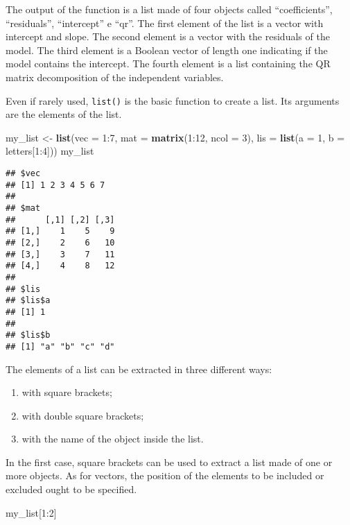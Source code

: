 \documentclass[]{book}
\newenvironment{Shaded}{\begin{snugshade}}{\end{snugshade}}
\newcommand{\KeywordTok}[1]{\textcolor[rgb]{0.13,0.29,0.53}{\textbf{{#1}}}}
\newcommand{\DataTypeTok}[1]{\textcolor[rgb]{0.13,0.29,0.53}{{#1}}}
\newcommand{\DecValTok}[1]{\textcolor[rgb]{0.00,0.00,0.81}{{#1}}}
\newcommand{\StringTok}[1]{\textcolor[rgb]{0.31,0.60,0.02}{{#1}}}
\newcommand{\NormalTok}[1]{{#1}}
\providecommand{\tightlist}{%
  \setlength{\itemsep}{0pt}\setlength{\parskip}{0pt}}
\def\tightlist{}
\begin{document}
The output of the function is a list made of four objects called
``coefficients'', ``residuals'', ``intercept'' e ``qr''. The first
element of the list is a vector with intercept and slope. The second
element is a vector with the residuals of the model. The third element
is a Boolean vector of length one indicating if the model contains the
intercept. The fourth element is a list containing the QR matrix
decomposition of the independent variables.

Even if rarely used, \texttt{list()} is the basic function to create a
list. Its arguments are the elements of the list.

\begin{Shaded}
\begin{Highlighting}[]
\NormalTok{my_list <-}\StringTok{ }\KeywordTok{list}\NormalTok{(}\DataTypeTok{vec =} \DecValTok{1}\NormalTok{:}\DecValTok{7}\NormalTok{, }\DataTypeTok{mat =} \KeywordTok{matrix}\NormalTok{(}\DecValTok{1}\NormalTok{:}\DecValTok{12}\NormalTok{, }\DataTypeTok{ncol =} \DecValTok{3}\NormalTok{),}
  \DataTypeTok{lis =} \KeywordTok{list}\NormalTok{(}\DataTypeTok{a =} \DecValTok{1}\NormalTok{, }\DataTypeTok{b =} \NormalTok{letters[}\DecValTok{1}\NormalTok{:}\DecValTok{4}\NormalTok{]))}
\NormalTok{my_list}
\end{Highlighting}
\end{Shaded}

\begin{verbatim}
## $vec
## [1] 1 2 3 4 5 6 7
## 
## $mat
##      [,1] [,2] [,3]
## [1,]    1    5    9
## [2,]    2    6   10
## [3,]    3    7   11
## [4,]    4    8   12
## 
## $lis
## $lis$a
## [1] 1
## 
## $lis$b
## [1] "a" "b" "c" "d"
\end{verbatim}

The elements of a list can be extracted in three different ways:

\begin{enumerate}
\def\labelenumi{\arabic{enumi}.}
\tightlist
\item
  with square brackets;
\item
  with double square brackets;
\item
  with the name of the object inside the list.
\end{enumerate}

In the first case, square brackets can be used to extract a list made of
one or more objects. As for vectors, the position of the elements to be
included or excluded ought to be specified.

\begin{Shaded}
\begin{Highlighting}[]
\NormalTok{my_list[}\DecValTok{1}\NormalTok{:}\DecValTok{2}\NormalTok{]}
\end{Highlighting}
\end{Shaded}
\end{document}
